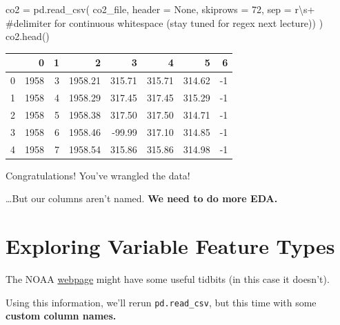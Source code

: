 \documentclass[
  letterpaper,
  DIV=11,
  numbers=noendperiod]{scrreprt}
\newenvironment{Shaded}{\begin{snugshade}}{\end{snugshade}}
\newcommand{\CommentTok}[1]{\textcolor[rgb]{0.37,0.37,0.37}{#1}}
\newcommand{\DecValTok}[1]{\textcolor[rgb]{0.68,0.00,0.00}{#1}}
\newcommand{\NormalTok}[1]{\textcolor[rgb]{0.00,0.23,0.31}{#1}}
\newcommand{\OperatorTok}[1]{\textcolor[rgb]{0.37,0.37,0.37}{#1}}
\newcommand{\VariableTok}[1]{\textcolor[rgb]{0.07,0.07,0.07}{#1}}
\newcommand{\VerbatimStringTok}[1]{\textcolor[rgb]{0.13,0.47,0.30}{#1}}
\begin{document}
\begin{Shaded}
\begin{Highlighting}[]
\NormalTok{co2 }\OperatorTok{=}\NormalTok{ pd.read\_csv(}
\NormalTok{    co2\_file, header }\OperatorTok{=} \VariableTok{None}\NormalTok{, skiprows }\OperatorTok{=} \DecValTok{72}\NormalTok{,}
\NormalTok{    sep }\OperatorTok{=} \VerbatimStringTok{r\textquotesingle{}\textbackslash{}s+\textquotesingle{}}       \CommentTok{\#delimiter for continuous whitespace (stay tuned for regex next lecture))}
\NormalTok{)}
\NormalTok{co2.head()}
\end{Highlighting}
\end{Shaded}

\begin{tabular}{lrrrrrrr}
\toprule
{} &     0 &  1 &       2 &      3 &      4 &      5 &  6 \\
\midrule
0 &  1958 &  3 & 1958.21 & 315.71 & 315.71 & 314.62 & -1 \\
1 &  1958 &  4 & 1958.29 & 317.45 & 317.45 & 315.29 & -1 \\
2 &  1958 &  5 & 1958.38 & 317.50 & 317.50 & 314.71 & -1 \\
3 &  1958 &  6 & 1958.46 & -99.99 & 317.10 & 314.85 & -1 \\
4 &  1958 &  7 & 1958.54 & 315.86 & 315.86 & 314.98 & -1 \\
\bottomrule
\end{tabular}

Congratulations! You've wrangled the data!

\ldots But our columns aren't named. \textbf{We need to do more EDA.}

\hypertarget{exploring-variable-feature-types}{%
\section{Exploring Variable Feature
Types}\label{exploring-variable-feature-types}}

The NOAA \href{https://gml.noaa.gov/ccgg/trends/}{webpage} might have
some useful tidbits (in this case it doesn't).

Using this information, we'll rerun \texttt{pd.read\_csv}, but this time
with some \textbf{custom column names.}
\end{document}
